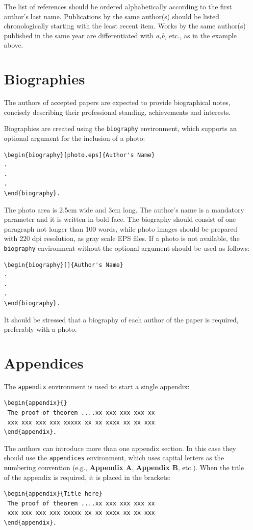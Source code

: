 \documentclass{amcs}
\begin{document}
The list of references should be ordered alphabetically according to the first author's last name. Publications by the same author(s) should be listed chronologically starting with the least recent item. Works by the same author(s) published in the same year are differentiated with \emph{a,b,} etc., as in the example above.


\section{Biographies}
The authors of accepted papers are expected to provide biographical notes, concisely describing their professional standing, achievements and interests.

Biographies are created using the \texttt{biography}
environment, which supports an optional argument for
the inclusion of a photo:
{\small\begin{verbatim}
\begin{biography}[photo.eps]{Author's Name}
.
.
.
\end{biography}.
\end{verbatim}}

The photo area is 2.5cm wide and 3cm long. The author's name is a mandatory parameter and it is written in bold face. The biography should consist of one paragraph not longer than 100 words, while photo images should be prepared with 220 dpi resolution, as gray scale EPS files. If a photo is not available, the \verb+biography+ environment without the optional argument should be used as follows:
{\small\begin{verbatim}
\begin{biography}[]{Author's Name}
.
.
.
\end{biography}.
\end{verbatim}}

It should be stressed that a biography of each author of the paper is required, preferably with a photo.

\section{Appendices}

The \verb+appendix+ environment is used to start a single appendix:
{\small \begin{verbatim}
\begin{appendix}{}
 The proof of theorem ....xx xxx xxx xxx xx
 xxx xxx xxx xxx xxxxx xx xx xxxx xx xx xxx
\end{appendix}.
\end{verbatim}}
The authors can introduce more than one appendix section. In this case they should use the \verb+appendices+ environment, which uses capital letters as the numbering convention (e.g., \textbf{Appendix A}, \textbf{Appendix B}, etc.). When the title of the appendix is required, it is placed in the brackets:
{\small \begin{verbatim}
\begin{appendix}{Title here}
 The proof of theorem ....xx xxx xxx xxx xx
 xxx xxx xxx xxx xxxxx xx xx xxxx xx xx xxx
\end{appendix}.
\end{verbatim}}
\end{document}
